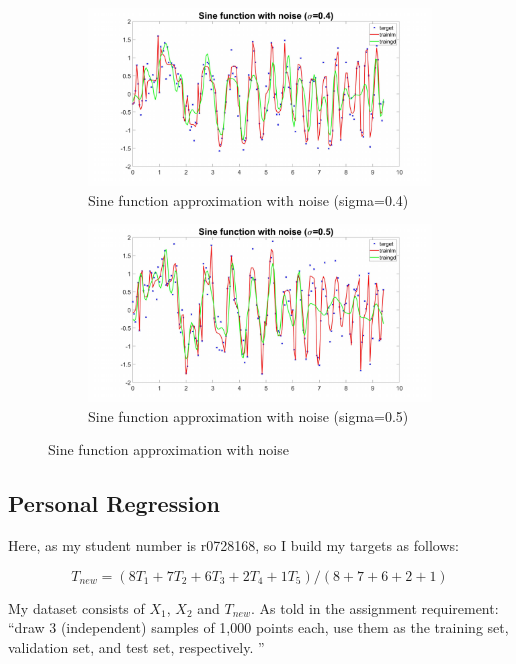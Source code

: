 \documentclass{article}
\begin{document}
\begin{figure}[h!]
\begin{subfigure}[b]{.49\textwidth}
  \centering
  \includegraphics[width=\linewidth]{lab1/error4.pdf}
  \caption{Sine function approximation with noise (sigma=0.4)}
  \label{fig:noise4}
\end{subfigure}
\hfill
\begin{subfigure}[b]{.49\textwidth}
  \centering
  \includegraphics[width=\linewidth]{lab1/error5.pdf}
  \caption{Sine function approximation with noise (sigma=0.5)}
  \label{fig:noise5}
\end{subfigure}
\caption{Sine function approximation with noise}
\label{fig:noiseapprox}
\end{figure}


\subsection{Personal Regression}
Here, as my student number is r0728168, so I build my targets as follows:

$$
T_{new}=(8 T_1+7 T_2+6 T_3+2 T_4+1 T_5) /(8+7+6+2+1)
$$

My dataset consists of $X_1$, $X_2$ and $T_{new}$. As told in the assignment requirement: ``draw 3 (independent) samples of 1,000
points each, use them as the training set, validation set, and test set, respectively. ''
\end{document}
